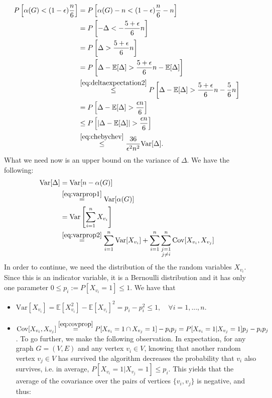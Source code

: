 \documentclass[10pt]{article}
\newenvironment{exercise}[2][Exercise]{\begin{trivlist}
  \item[\hskip \labelsep {\bfseries #1}\hskip \labelsep {\bfseries #2.}]}{\end{trivlist}}
\begin{document}
\begin{exercise}{1c}
\begin{align*}
P\left[\alpha(G) < (1-\epsilon)\frac{n}{6}\right] 	& = P\left[ \alpha(G) - n < (1-\epsilon)\frac{n}{6}-n\right] & \\
							& = P\left[-\Delta < -\frac{5+\epsilon}{6}n\right]  & \\ 
							& = P\left[\Delta > \frac{5+\epsilon}{6}n\right] & \\
							& = P\left[\Delta - \mathbb{E}[\Delta] > \frac{5+\epsilon}{6}n - \mathbb{E}[\Delta] \right] & \\
							&  \overset{\eqref{eq:deltaexpectation2}}{\leq} P\left[\Delta - \mathbb{E}[\Delta] > \frac{5+\epsilon}{6}n - \frac{5}{6}n \right]	 & \\
							& = P\left[\Delta - \mathbb{E}[\Delta] > \frac{\epsilon n}{6} \right]	 & \\
							& \leq P\left[|\Delta - \mathbb{E}[\Delta]| > \frac{\epsilon n}{6} \right]	 & \\	
							& \overset{\eqref{eq:chebychev}}{\leq} \frac{36}{\epsilon^2 n^2} \mathrm{Var}[\Delta].						
\end{align*}
What we need now is an upper bound on the variance of $\Delta$. We have the following:
\begin{align*} \mathrm{Var}[\Delta]  	& =  \mathrm{Var}[n - \alpha(G)]  & \\
							& \overset{\eqref{eq:varprop1}}{=}  \mathrm{Var}[\alpha(G)]  & \\
							& = \mathrm{Var}\left[\sum_{i=1}^{n} X_{v_i}\right] & \\
							& \overset{\eqref{eq:varprop2}}{=} \sum_{i=1}^{n} \mathrm{Var}[X_{v_i}] + \sum_{i = 1}^{n} \sum_{\substack{j=1 \\ j\neq i}}^{n}\mathrm{Cov}[X_{v_i}, X_{v_j}] & \\
\end{align*} 
In order to continue, we need the distribution of the the random variables $X_{v_i}$. Since this is an indicator variable, it is a Bernoulli distribution and it has only one parameter $0 \leq p_i := P[X_{v_i}=1] \leq 1$. We have that
\begin{itemize}
\item $\mathrm{Var}[X_{v_i}] = \mathbb{E}[X_{v_i}^2]-\mathbb{E}[X_{v_i}]^2 = p_i-p_i^2 \leq 1, \quad \forall i = 1,...,n$. 
\item $\mathrm{Cov}[X_{v_i}, X_{v_j}]  \overset{\eqref{eq:covprop}}{=}P[X_{v_i}=1 \cap X_{v_j}=1] - p_ip_j = P[X_{v_i}=1 | X_{v_j}=1]p_j - p_ip_j$. To go further, we make the following observation. In expectation, for any graph $G=(V,E)$ and any vertex $v_i \in V$, knowing that another random vertex $v_j \in V$ has survived the algorithm decreases the probability that $v_i$ also survives, i.e. in average, $P[X_{v_i}=1 | X_{v_j}=1] \leq p_i$. This yields that the average of the covariance over the pairs of vertices $\{v_i, v_j\}$ is negative, and thus:

\end{itemize}
\end{exercise}
\end{document}
